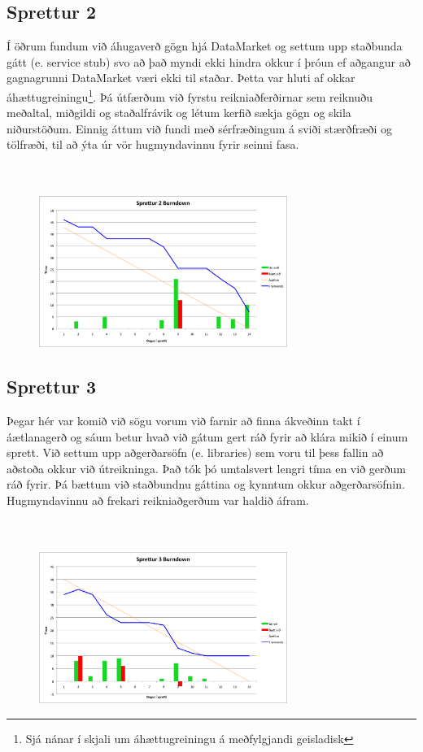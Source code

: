 \documentclass{article}
\begin{document}
\subsection{Sprettur 2}
Í öðrum fundum við áhugaverð gögn hjá DataMarket og settum upp staðbunda
gátt (e. service stub) svo að það myndi ekki hindra okkur í þróun ef 
aðgangur að gagnagrunni DataMarket væri ekki til staðar. Þetta var hluti af
okkar áhættugreiningu\footnote[1]{Sjá nánar í skjali um áhættugreiningu á meðfylgjandi geisladisk}. 
Þá útfærðum við fyrstu reikniaðferðirnar sem reiknuðu meðaltal, miðgildi og staðalfrávik
og létum kerfið sækja gögn og skila niðurstöðum.
Einnig áttum við fundi með sérfræðingum á sviði stærðfræði og tölfræði, til að ýta
úr vör hugmyndavinnu fyrir seinni fasa.
\hfil \\
\hfil \\
\hfil \\
\begin{figure}[H]
 \centering
 \includegraphics[width=0.72\textwidth]{Sprettur2_Burndown.png}
 \caption{}
\end{figure}
\label{fig:sp2}
\newpage
\subsection{Sprettur 3}
Þegar hér var komið við sögu vorum við farnir að finna ákveðinn takt í
áætlanagerð og sáum betur hvað við gátum gert ráð fyrir að klára mikið 
í einum sprett. Við settum upp aðgerðarsöfn (e. libraries) sem voru til þess fallin að
aðstoða okkur við útreikninga. Það tók þó umtalsvert lengri tíma en við gerðum
ráð fyrir. Þá bættum við staðbundnu gáttina og kynntum okkur aðgerðarsöfnin.
Hugmyndavinnu að frekari reikniaðgerðum var haldið áfram.
\hfil \\
\hfil \\
\hfil \\
\begin{figure}[H]
 \centering
 \includegraphics[width=0.72\textwidth]{Sprettur3_Burndown.png}
 \caption{}
\end{figure}
\label{fig:sp3}
\newpage
\end{document}
